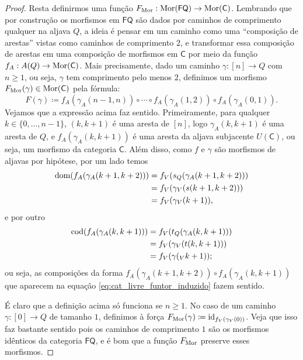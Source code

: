 \begin{proof}
    Resta definirmos uma função $F_{\mathrm{Mor}}: \mathrm{Mor}(\mathsf{FQ}) \to \mathrm{Mor}(\mathsf{C})$.
    Lembrando que por construção os morfismos em $\mathsf{FQ}$ são dados por caminhos de comprimento qualquer na aljava $Q$, a ideia é pensar em um caminho como uma ``composição de arestas'' vistas como caminhos de comprimento $2$, e transformar essa composição de arestas em uma composição de morfismos em $\mathsf{C}$ por meio da função $f_A: A(Q) \to \mathrm{Mor}(\mathsf{C})$.
    Mais precisamente, dado um caminho $\gamma: [n] \to Q$ com $n \geq 1$, ou seja, $\gamma$ tem comprimento pelo menos $2$, definimos um morfismo $F_{\mathrm{Mor}}(\gamma) \in \mathrm{Mor}(\mathsf{C})$ pela fórmula:
    \begin{equation}\label{eq:cat_livre_funtor_induzido}
        F(\gamma) \coloneqq f_A(\gamma_A(n-1,n)) \circ \dotsm \circ f_A(\gamma_A(1,2)) \circ f_A(\gamma_A(0,1)).
    \end{equation}
    Vejamos que a expressão acima faz sentido.
    Primeiramente, para qualquer $k \in \{0,\dots,n-1\}$, $(k,k+1)$ é uma aresta de $[n]$, logo $\gamma_A(k,k+1)$ é uma aresta de $Q$, e $f_A(\gamma_A(k,k+1))$ é uma aresta da aljava subjacente $U(\mathsf{C})$, ou seja, um morfismo da categoria $\mathsf{C}$.
    Além disso, como $f$ e $\gamma$ são morfismos de aljavas por hipótese, por um lado temos
    \begin{align*}
        \mathrm{dom}(f_A(\gamma_A(k+1,k+2)))
        & = f_V(s_Q(\gamma_A(k+1,k+2))) \\
        & = f_V(\gamma_V(s(k+1,k+2))) \\
        & = f_V(\gamma_V(k+1)),
    \end{align*}
    e por outro
    \begin{align*}
        \mathrm{cod}(f_A(\gamma_A(k,k+1)))
        & = f_V(t_Q(\gamma_A(k,k+1))) \\
        & = f_V(\gamma_V(t(k,k+1))) \\
        & = f_V(\gamma(_Vk+1));
    \end{align*}
    ou seja, as composições da forma $f_A(\gamma_A(k+1,k+2)) \circ f_A(\gamma_A(k,k+1))$ que aparecem na equação \eqref{eq:cat_livre_funtor_induzido} fazem sentido.

    É claro que a definição acima só funciona se $n \geq 1$.
    No caso de um caminho $\gamma: [0] \to Q$ de tamanho $1$, definimos à força $F_{\mathrm{Mor}}(\gamma) \coloneqq \mathrm{id}_{f_V(\gamma_V(0))}$.
    Veja que isso faz bastante sentido pois os caminhos de comprimento $1$ são os morfismos idênticos da categoria $\mathsf{FQ}$, e é bom que a função $F_{\mathrm{Mor}}$ preserve esses morfismos.


\end{proof}
